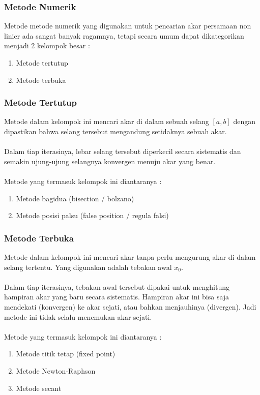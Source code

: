 \documentclass{beamer}
\begin{document}

\begin{frame}
\frametitle{Metode Numerik}
Metode metode numerik yang digunakan untuk pencarian akar persamaan non linier ada sangat banyak ragamnya, tetapi secara umum dapat dikategorikan menjadi 2 kelompok besar :
\begin{enumerate}
\item Metode tertutup
\item Metode terbuka
\end{enumerate}
\end{frame}


\begin{frame}
\frametitle{Metode Tertutup}
Metode dalam kelompok ini mencari akar di dalam sebuah selang $[a,b]$ dengan dipastikan bahwa selang tersebut mengandung setidaknya sebuah akar. 
\\\ \\Dalam tiap iterasinya, lebar selang tersebut diperkecil secara sistematis dan semakin ujung-ujung selangnya konvergen menuju akar yang benar.
\\\ \\Metode yang termasuk kelompok ini diantaranya :
\begin{enumerate}
\item Metode bagidua (bisection / bolzano)
\item Metode posisi palsu (false position / regula falsi)
\end{enumerate}
\end{frame}


\begin{frame}
\frametitle{Metode Terbuka}
Metode dalam kelompok ini mencari akar tanpa perlu mengurung akar di dalam selang tertentu. Yang digunakan adalah tebakan awal $x_0$. 
\\\ \\Dalam tiap iterasinya, tebakan awal tersebut dipakai untuk menghitung hampiran akar yang baru secara sistematis. Hampiran akar ini bisa saja mendekati (konvergen) ke akar sejati, atau bahkan menjauhinya (divergen). Jadi metode ini tidak selalu menemukan akar sejati.
\\\ \\Metode yang termasuk kelompok ini diantaranya :
\begin{enumerate}
\item Metode titik tetap (fixed point)
\item Metode Newton-Raphson
\item Metode secant
\end{enumerate}
\end{frame}
\end{document}
